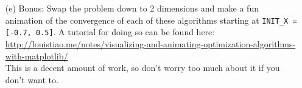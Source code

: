 \documentclass[12pt]{article}
\begin{document}
\begin{enumerate}
	
\item[(e)]
	Bonus: Swap the problem down to 2 dimensions and make a fun animation of the convergence of each of these algorithms starting at \texttt{INIT\_X = [-0.7, 0.5]}.  A tutorial for doing so can be found here:\\
	\url{http://louistiao.me/notes/visualizing-and-animating-optimization-algorithms-with-matplotlib/}\\
	This is a decent amount of work, so don't worry too much about it if you don't want to.
\end{enumerate}
\end{document}

